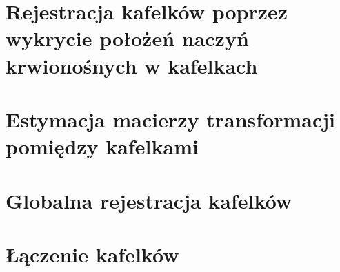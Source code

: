 \section{Rejestracja kafelków poprzez wykrycie położeń naczyń krwionośnych w kafelkach}
\label{sec:proponowane_algorytmy:depth_first_search}

\section{Estymacja macierzy transformacji pomiędzy kafelkami}
\label{sec:proponowane_algorytmy:estymacja}

\section{Globalna rejestracja kafelków}
\label{sec:proponowane_algorytmy:globalna_rejestracja}

\section{Łączenie kafelków}
\label{sec:proponowane_algorytmy:laczenie_kafelkow}